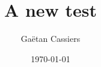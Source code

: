 \documentclass[english,frenchb, 10pt, oneside, headings=normal]{scrartcl}
\begin{document}
\titlehead{The try of the day}
\subject{}
\title{A new test}
\subtitle{}
\author{Gaëtan Cassiers}
\date{\today}
\publishers{}

\maketitle
\end{document}
